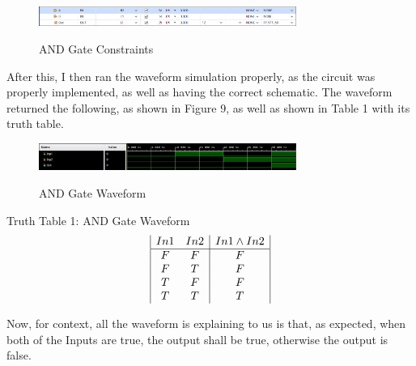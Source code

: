 \documentclass{article}
\begin{document}
\begin{figure}[!htbp]
    \centering
    \caption{AND Gate Constraints}
    \includegraphics[width=0.75\textwidth]{AND-GATE-CONSTRAINTS.png}
    \label{AND Gate, Constrants}
\end{figure}\newpage
After this, I then ran the waveform simulation properly, as the circuit was properly implemented, as well as having the correct schematic. The waveform returned the following, as shown in Figure 9, as well as shown in Table 1 with its truth table.
\begin{figure}[!htbp]
    \centering
    \caption{AND Gate Waveform}
    \includegraphics[width=0.75\textwidth]{AND-GATE-WAVEFORM.png}
    \label{AND Gate, Waveform}
\end{figure}\newline
\begin{center}
    Truth Table 1: AND Gate Waveform
    \begin{displaymath}
    \begin{array}{|c c|c|}
    In1 & In2 & In1 \land In2\\
    \hline
    F & F & F\\
    F & T & F\\
    T & F & F\\
    T & T & T\\
    \end{array}
    \end{displaymath}
\end{center}
Now, for context, all the waveform is explaining to us is that, as expected, when both of the Inputs are true, the output shall be true, otherwise the output is false.
\newpage
\end{document}
